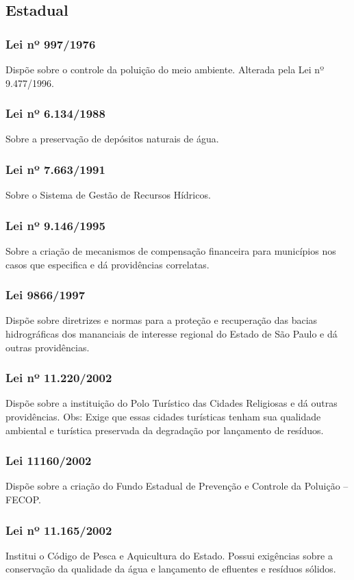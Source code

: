 \begin{subapend}
	\subsection{Estadual}
	\begin{subsubapend}
		\subsubsection{Lei nº 997/1976}
		Dispõe sobre o controle da poluição do meio ambiente. Alterada pela Lei nº 9.477/1996.
		\subsubsection{Lei nº 6.134/1988}
		Sobre a preservação de depósitos naturais de água.
		\subsubsection{Lei nº 7.663/1991}
		Sobre o Sistema de Gestão de Recursos Hídricos.
		\subsubsection{Lei nº 9.146/1995}
		Sobre a criação de mecanismos de compensação financeira para municípios nos casos que especifica e dá providências correlatas.
		\subsubsection{Lei 9866/1997}
		Dispõe sobre diretrizes e normas para a proteção e recuperação das bacias hidrográficas dos mananciais de interesse regional do Estado de São Paulo e dá outras providências.
		\subsubsection{Lei nº 11.220/2002}
		Dispõe sobre a instituição do Polo Turístico das Cidades Religiosas e dá outras providências. Obs: Exige que essas cidades turísticas tenham sua qualidade ambiental e turística preservada da degradação por lançamento de resíduos.
		\subsubsection{Lei 11160/2002}
		Dispõe sobre a criação do Fundo Estadual de Prevenção e Controle da Poluição – FECOP.
		\subsubsection{Lei nº 11.165/2002}
		Institui o Código de Pesca e Aquicultura do Estado. Possui exigências sobre a conservação da qualidade da água e lançamento de efluentes e resíduos sólidos.

\end{subsubapend}
\end{subapend}
